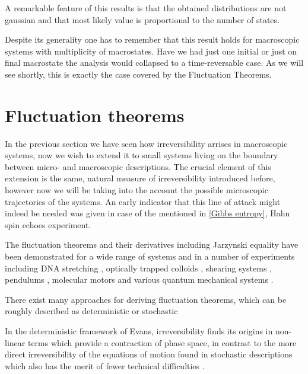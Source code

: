 \documentclass[a4paper,12pt]{article}
\begin{document}
A remarkable feature of this results is that the obtained distributions are not gaussian and that most likely value is proportional to the number of states. 

Despite its generality one has to remember that this result holds for macroscopic systems with multiplicity of macrostates. Have we had just one initial or just on final macrostate the analysis would collapsed to a time-reversable case. As we will see shortly, this is exactly the case covered by the Fluctuation Theorems.

\section{Fluctuation theorems}

In the previous section we have seen how irreversibility arrises in macroscopic systems, now we wish to extend it to small systems living on the boundary between micro- and macroscopic descriptions. The crucial element of this extension is the same, natural measure of irreversibility introduced before, however now we will be taking into the account the possible microscopic trajectories of the systems. 
An early indicator that this line of attack might indeed be needed was given in case of the mentioned in \ref{Gibbs entropy}, Hahn spin echoes experiment.

The fluctuation theorems and their derivatives including Jarzynski equality have been demonstrated for a wide range of systems and in a number of experiments including DNA stretching \cite{Collin:2005fx}, optically trapped colloids \cite{Carberry:2007be}, shearing systems \cite{Evans:1993bl}, pendulums \cite{Ciliberto:2010jg}, molecular motors \cite{Seifert:2005it} and various quantum mechanical systems \cite{Monnai:2005ke}.

There exist many approaches for deriving fluctuation theorems, which can be roughly described as deterministic\cite{Evans:2002gg}\cite{Evans:2241458} or stochastic \cite{Kurchan:1998}

In the deterministic framework of Evans, irreversibility finds its origins in non-linear terms which provide a contraction of phase space, in contrast to the more direct irreversibility of the equations of motion found in stochastic descriptions which also has the merit of fewer technical difficulties \cite{Crooks:2008ta}. 
\end{document}
